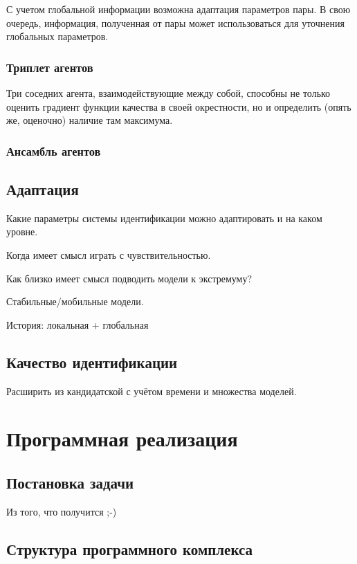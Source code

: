 \documentclass[a4paper,12pt]{article}
\begin{document}
С учетом глобальной информации возможна адаптация параметров пары.
В свою очередь, информация, полученная от пары может
использоваться для уточнения глобальных параметров.

\subsubsection{Триплет агентов}

Три соседних агента, взаимодействующие между собой,
способны не только оценить градиент функции качества в своей окрестности,
но и определить (опять же, оценочно) наличие там максимума.

\subsubsection{Ансамбль агентов}

\subsection{Адаптация}

Какие параметры системы идентификации можно адаптировать
и на каком уровне.

Когда имеет смысл играть с чувствительностью.

Как близко имеет смысл подводить модели к экстремуму?


Стабильные/мобильные модели.

История: локальная + глобальная

\subsection{Качество идентификации}

Расширить из кандидатской с учётом времени и множества моделей.



\section{Программная реализация}

\subsection{Постановка задачи}

Из того, что получится ;-)

\subsection{Структура программного комплекса}
\end{document}
